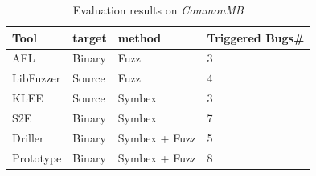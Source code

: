 \begin{table}
  \caption{\label{CommonMB-results}Evaluation results on \textit{CommonMB}}
  \centering
	\begin{tabular}{p{2cm}<{\centering} p{2cm}<{\centering} p{3cm}<{\centering} p{3cm}<{\centering}}
		\toprule
		Tool                     & target   & method                  & Triggered Bugs\# \\ \midrule
		AFL                      & Binary   & Fuzz                    & 3             \\
		LibFuzzer                & Source   & Fuzz                    & 4             \\
		KLEE                     & Source   & Symbex                  & 3             \\
		S2E                      & Binary   & Symbex                  & 7             \\
		Driller                  & Binary   & Symbex + Fuzz           & 5             \\
		Prototype                & Binary   & Symbex + Fuzz           & 8             \\ \bottomrule
	\end{tabular}
\end{table}

